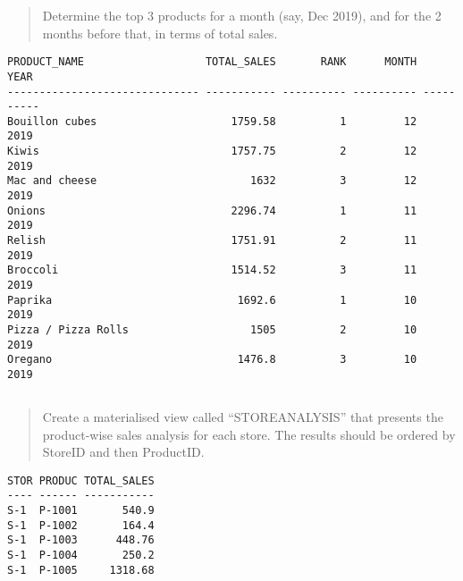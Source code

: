 \documentclass[
  a4paper,
]{article}
\newcommand{\sqloutputbegin}[1][SQL Output]{
        \hspace{0.5cm}
        \begin{minipage}[c]{0.93\linewidth} 
        \centering
        \begin{tcolorbox}[colback=gray!8, colframe=white,
            boxrule=0pt, coltitle=black,
            colbacktitle=gray!15, title={#1}]
        \centering
        \small}
\newcommand{\sqloutputend}{
        \end{tcolorbox} 
        \end{minipage}}
\begin{document}
\begin{quote}
Determine the top 3 products for a month (say, Dec 2019), and for the 2
months before that, in terms of total sales.
\end{quote}

\sqloutputbegin

\begin{verbatim}
PRODUCT_NAME                   TOTAL_SALES       RANK      MONTH       YEAR
------------------------------ ----------- ---------- ---------- ----------
Bouillon cubes                     1759.58          1         12       2019
Kiwis                              1757.75          2         12       2019
Mac and cheese                        1632          3         12       2019
Onions                             2296.74          1         11       2019
Relish                             1751.91          2         11       2019
Broccoli                           1514.52          3         11       2019
Paprika                             1692.6          1         10       2019
Pizza / Pizza Rolls                   1505          2         10       2019
Oregano                             1476.8          3         10       2019
\end{verbatim}

\sqloutputend

\hypertarget{section-3}{%
\subsection{}\label{section-3}}

\begin{quote}
Create a materialised view called ``STOREANALYSIS'' that presents the
product-wise sales analysis for each store. The results should be
ordered by StoreID and then ProductID.
\end{quote}

\sqloutputbegin[SQL Output\footnotemark]

\begin{verbatim}
STOR PRODUC TOTAL_SALES
---- ------ -----------
S-1  P-1001       540.9
S-1  P-1002       164.4
S-1  P-1003      448.76
S-1  P-1004       250.2
S-1  P-1005     1318.68
\end{verbatim}

\sqloutputend

\end{document}
